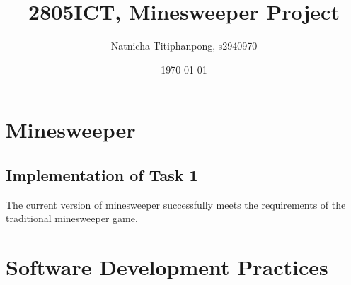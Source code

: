 \documentclass[12pt, a4]{report}
\title{2805ICT, Minesweeper Project}
\author{Natnicha Titiphanpong, s2940970}%
\date{\today}
\begin{document}
\begin{titlepage}
	\maketitle 
\end{titlepage}
	\tableofcontents
	\pagebreak
	\section{Minesweeper} 
	\subsection{Implementation of Task 1}
	\par The current  version of minesweeper successfully meets the requirements of the traditional minesweeper game.
	
	
	\section{Software Development Practices}
\end{document}
